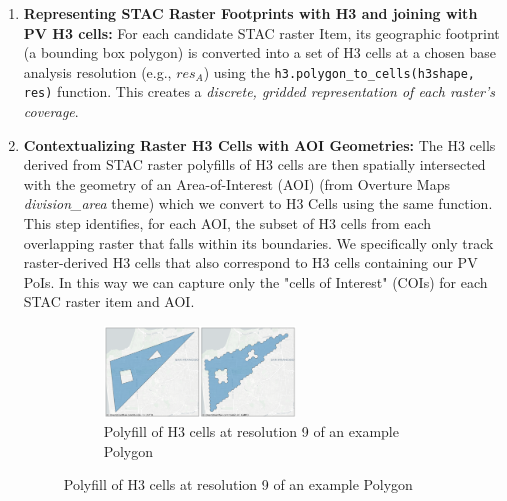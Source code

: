 \begin{enumerate}
    \item \textbf{Representing STAC Raster Footprints with H3 and joining with PV H3 cells:}
        For each candidate STAC raster Item, its geographic footprint (a bounding box polygon) is converted into a set of H3 cells at a chosen base analysis resolution (e.g., $res_A$) using the \texttt{h3.polygon\_to\_cells(h3shape, res)} function. 
        This creates a \textit{discrete, gridded representation of each raster's coverage}.

    \item \textbf{Contextualizing Raster H3 Cells with AOI Geometries:}
        The H3 cells derived from STAC raster polyfills of H3 cells are then spatially intersected with the geometry of an Area-of-Interest (AOI) (from Overture Maps \textit{division\_area} theme) which we convert to H3 Cells using the same function. 
        This step identifies, for each AOI, the subset of H3 cells from each overlapping raster that falls within its boundaries. We specifically only track raster-derived H3 cells that also correspond to H3 cells containing our PV PoIs. 
        In this way we can capture only the "cells of Interest" (COIs) for each STAC raster item and AOI.
        
        \begin{figure}[ht]
            \centering
            \begin{subfigure}{\textwidth}
                \centering
                \includegraphics[width=0.6\textwidth]{report/assets/figures/h3_polygonToCells_example_res9.png}
                \caption{Polyfill of H3 cells at resolution 9 of an example Polygon}
            \end{subfigure}
            

\end{figure}
\end{enumerate}
